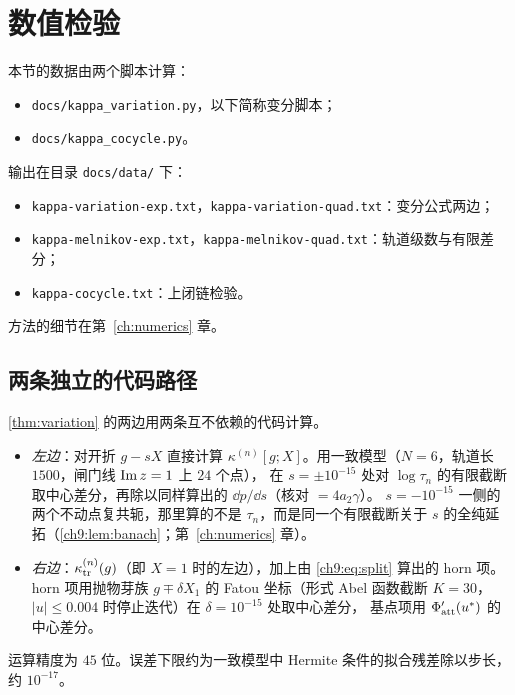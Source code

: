 \section{数值检验}\label{ch9:sec:numerics}

本节的数据由两个脚本计算：
\begin{itemize}
\item \texttt{docs/kappa\_variation.py}，以下简称变分脚本；
\item \texttt{docs/kappa\_cocycle.py}。
\end{itemize}
输出在目录 \texttt{docs/data/} 下：
\begin{itemize}
\item \texttt{kappa-variation-exp.txt}，\texttt{kappa-variation-quad.txt}：变分公式两边；
\item \texttt{kappa-melnikov-exp.txt}，\texttt{kappa-melnikov-quad.txt}：轨道级数与有限差分；
\item \texttt{kappa-cocycle.txt}：上闭链检验。
\end{itemize}
方法的细节在第~\ref{ch:numerics} 章。

\subsection{两条独立的代码路径}
\cref{thm:variation} 的两边用两条互不依赖的代码计算。
\begin{itemize}
\item \emph{左边}：对开折 $g-sX$ 直接计算 $\kappa^{(n)}[g;X]$。用一致模型（$N=6$，轨道长 $1500$，闸门线 $\operatorname{Im} z=1$ 上 $24$ 个点），
在 $s=\pm10^{-15}$ 处对 $\log\tau_n$ 的有限截断取中心差分，再除以同样算出的 $\dd p/\dd s$（核对 $=4a_2\gamma$）。
$s=-10^{-15}$ 一侧的两个不动点复共轭，那里算的不是 $\tau_n$，而是同一个有限截断关于 $s$ 的全纯延拓（\cref{ch9:lem:banach}；第~\ref{ch:numerics} 章）。
\item \emph{右边}：$\kappa_{\mathrm{tr}}^{(n)}(g)$（即 $X=1$ 时的左边），加上由 \eqref{ch9:eq:split} 算出的 horn 项。
horn 项用抛物芽族 $g\mp\delta X_1$ 的 Fatou 坐标（形式 Abel 函数截断 $K=30$，$|u|\le0.004$ 时停止迭代）在 $\delta=10^{-15}$ 处取中心差分，
基点项用 $\Phi_{\mathrm{att}}'(u^{*})$ 的中心差分。
\end{itemize}
运算精度为 $45$ 位。误差下限约为一致模型中 Hermite 条件的拟合残差除以步长，约 $10^{-17}$。

